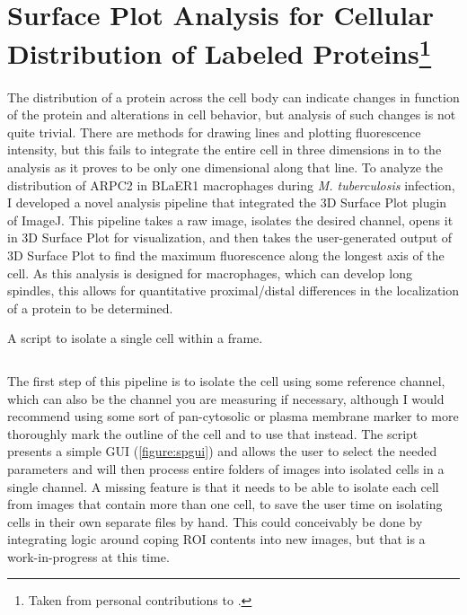 \section[Surface Plot Analysis for Cellular Distribution of Labeled Proteins]{Surface Plot Analysis for Cellular Distribution of Labeled Proteins\footnote{Taken from personal contributions to \citet{Saelens2022}.}}

The distribution of a protein across the cell body can indicate changes in function of the protein and alterations in cell behavior, but analysis of such changes is not quite trivial. There are methods for drawing lines and plotting fluorescence intensity, but this fails to integrate the entire cell in three dimensions in to the analysis as it proves to be only one dimensional along that line. To analyze the distribution of ARPC2 in BLaER1 macrophages during \textit{M. tuberculosis} infection, I developed a novel analysis pipeline that integrated the 3D Surface Plot plugin of ImageJ. This pipeline takes a raw image, isolates the desired channel, opens it in 3D Surface Plot for visualization, and then takes the user-generated output of 3D Surface Plot to find the maximum fluorescence along the longest axis of the cell. As this analysis is designed for macrophages, which can develop long spindles, this allows for quantitative proximal/distal differences in the localization of a protein to be determined.

\begin{code}
\caption{A script to isolate a single cell within a frame.}
\label{isolator}

\inputminted[breaklines,frame=single,fontsize=\small]{python}{source/autoIsolator.py}

\end{code}

The first step of this pipeline is to isolate the cell using some reference channel, which can also be the channel you are measuring if necessary, although I would recommend using some sort of pan-cytosolic or plasma membrane marker to more thoroughly mark the outline of the cell and to use that instead. The script presents a simple GUI (\autoref{figure:spgui}) and allows the user to select the needed parameters and will then process entire folders of images into isolated cells in a single channel. A missing feature is that it needs to be able to isolate each cell from images that contain more than one cell, to save the user time on isolating cells in their own separate files by hand. This could conceivably be done by integrating logic around coping ROI contents into new images, but that is a work-in-progress at this time.

